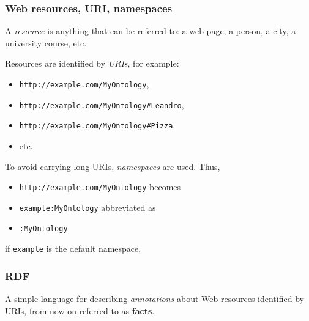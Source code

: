 \documentclass{beamer}
\begin{document}
\begin{frame}
  \frametitle{Web resources, URI, namespaces}

  A \textit{resource} is anything that can be referred to: a web page, a
  person, a city, a university course, etc.

  \pause

  \medskip

  Resources are identified by \textit{URIs}, for example:

  \begin{itemize}
    \item \texttt{http://example.com/MyOntology},
    \item \texttt{http://example.com/MyOntology\#Leandro},
    \item \texttt{http://example.com/MyOntology\#Pizza},
    \item etc.
  \end{itemize}

  \pause

  To avoid carrying long URIs, \textit{namespaces} are used. \pause Thus,

  \pause

  \begin{itemize}
    \item \texttt{http://example.com/MyOntology} \pause \hfill becomes

    \pause

    \item \texttt{example:MyOntology} \pause \hfill abbreviated as

    \pause

    \item \texttt{:MyOntology}
  \end{itemize}

  \pause

  if \texttt{example} is the default namespace.
\end{frame}

\begin{frame}
  \frametitle{RDF}

  A simple language for describing \textit{annotations} about Web resources
  identified by URIs, from now on referred to as \textbf{facts}.
\end{frame}
\end{document}
